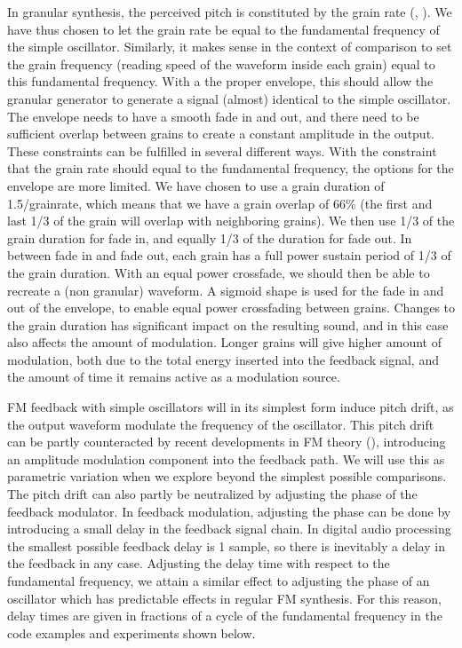\documentclass[runningheads,a4paper]{llncs}
\begin{document}
In granular synthesis, the perceived pitch is constituted by the grain rate (\cite{Roads-2001}, \cite{Brandtsegg-particle}). We have thus chosen to let the grain rate be equal to the fundamental frequency of the simple oscillator. Similarly, it makes sense in the context of comparison to set the grain frequency (reading speed of the waveform inside each grain) equal to this fundamental frequency. With a the proper envelope, this should allow the granular generator to generate a signal (almost) identical to the simple oscillator. The envelope needs to have a smooth fade in and out, and there need to be sufficient overlap between grains to create a constant amplitude in the output. These constraints can be fulfilled in several different ways. With the constraint that the grain rate should equal to the fundamental frequency, the options for the envelope are more limited. We have chosen to use a grain duration of 1.5/grainrate, which means that we have a grain overlap of 66\% (the first and last 1/3 of the grain will overlap with neighboring grains). We then use 1/3 of the grain duration for fade in, and equally 1/3 of the duration for fade out. In between fade in and fade out, each grain has a full power sustain period of 1/3 of the grain duration. With an equal power crossfade, we should then be able to recreate a (non granular) waveform. A sigmoid shape is used for the fade in and out of the envelope, to enable equal power crossfading between grains. Changes to the grain duration has significant impact on the resulting sound, and in this case also affects the amount of modulation. Longer grains will give higher amount of modulation, both due to the total energy inserted into the feedback signal, and the amount of time it remains active as a modulation source.

FM feedback with simple oscillators will in its simplest form induce pitch drift, as the output waveform modulate the frequency of the oscillator. This pitch drift can be partly counteracted by recent developments in FM theory (\cite{Lazzarini-2024}), introducing an amplitude modulation component into the feedback path. We will use this as parametric variation when we explore beyond the simplest possible comparisons. The pitch drift can also partly be neutralized by adjusting the phase of the feedback modulator. In feedback modulation, adjusting the phase can be done by introducing a small delay in the feedback signal chain. In digital audio processing the smallest possible feedback delay is 1 sample, so there is inevitably a delay in the feedback in any case. Adjusting the delay time with respect to the fundamental frequency, we attain a similar effect to adjusting the phase of an oscillator which has predictable effects in regular FM synthesis. For this reason, delay times are given in fractions of a cycle of the fundamental frequency in the code examples and experiments shown below.
\end{document}
